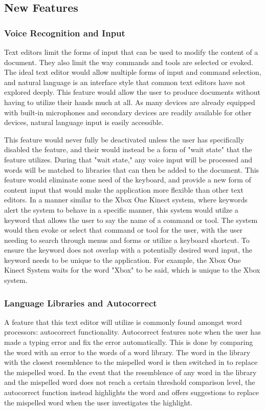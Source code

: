 \documentclass[11pt, oneside]{article}
\begin{document}
\subsection{New Features}
\subsubsection{Voice Recognition and Input}
Text editors limit the forms of input that can be used to modify the content of a document. They also limit the way commands and tools are selected or evoked. The ideal text editor would allow multiple forms of input and command selection, and natural language is an interface style that common text editors have not explored deeply. This feature would allow the user to produce documents without having to utilize their hands much at all. As many devices are already equipped with built-in microphones and secondary devices are readily available for other devices, natural language input is easily accessible. 

This feature would never fully be deactivated unless the user has specifically disabled the feature, and their would instead be a form of "wait state" that the feature utilizes. During that "wait state," any voice input will be processed and words will be matched to libraries that can then be added to the document. This feature would eliminate some need of the keyboard, and provide a new form of content input that would make the application more flexible than other text editors. In a manner similar to the Xbox One Kinect system, where keywords alert the system to behave in a specific manner, this system would utilze a keyword that allows the user to say the name of a command or tool. The system would then evoke or select that command or tool for the user, with the user needing to search through menus and forms or utilize a keyboard shortcut. To ensure the keyword does not overlap with a potentially desired word input, the keyword needs to be unique to the application. For example, the Xbox One Kinect System waits for the word "Xbox" to be said, which is unique to the Xbox system. 

\subsubsection{Language Libraries and Autocorrect}
A feature that this text editor will utilize is commonly found amongst word processors: autocorrect functionality. Autocorrect features note when the user has made a typing error and fix the error automatically. This is done by comparing the word with an error to the words of a word library. The word in the library with the closest resemblence to the mispelled word is then switched in to replace the mispelled word. In the event that the resemblence of any word in the library and the mispelled word does not reach a certain threshold comparison level, the autocorrect function instead highlights the word and offers suggestions to replace the mispelled word when the user investigates the highlight. 
\end{document}
